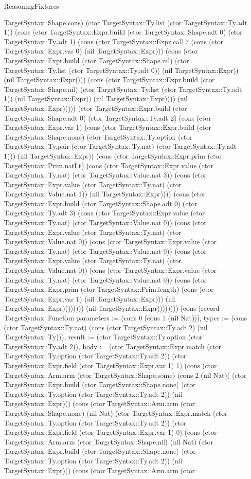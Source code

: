 \begin{lexlean}{ReasoningFixtures}
\begin{semanticmodule}
{TargetSyntax::Shape.cons) (ctor TargetSyntax::Ty.list (ctor TargetSyntax::Ty.adt 1)) (cons (ctor TargetSyntax::Expr.build (ctor TargetSyntax::Shape.adt 0) (ctor TargetSyntax::Ty.adt 1) (cons (ctor TargetSyntax::Expr.call 7 (cons (ctor TargetSyntax::Expr.var 0) (nil TargetSyntax::Expr))) (cons (ctor TargetSyntax::Expr.build (ctor TargetSyntax::Shape.nil) (ctor TargetSyntax::Ty.list (ctor TargetSyntax::Ty.adt 0)) (nil TargetSyntax::Expr)) (nil TargetSyntax::Expr)))) (cons (ctor TargetSyntax::Expr.build (ctor TargetSyntax::Shape.nil) (ctor TargetSyntax::Ty.list (ctor TargetSyntax::Ty.adt 1)) (nil TargetSyntax::Expr)) (nil TargetSyntax::Expr)))) (nil TargetSyntax::Expr))))) (ctor TargetSyntax::Expr.build (ctor TargetSyntax::Shape.adt 0) (ctor TargetSyntax::Ty.adt 2) (cons (ctor TargetSyntax::Expr.var 1) (cons (ctor TargetSyntax::Expr.build (ctor TargetSyntax::Shape.none) (ctor TargetSyntax::Ty.option (ctor TargetSyntax::Ty.pair (ctor TargetSyntax::Ty.nat) (ctor TargetSyntax::Ty.adt 1))) (nil TargetSyntax::Expr)) (cons (ctor TargetSyntax::Expr.prim (ctor TargetSyntax::Prim.natLt) (cons (ctor TargetSyntax::Expr.value (ctor TargetSyntax::Ty.nat) (ctor TargetSyntax::Value.nat 3)) (cons (ctor TargetSyntax::Expr.value (ctor TargetSyntax::Ty.nat) (ctor TargetSyntax::Value.nat 1)) (nil TargetSyntax::Expr)))) (cons (ctor TargetSyntax::Expr.build (ctor TargetSyntax::Shape.adt 0) (ctor TargetSyntax::Ty.adt 3) (cons (ctor TargetSyntax::Expr.value (ctor TargetSyntax::Ty.nat) (ctor TargetSyntax::Value.nat 0)) (cons (ctor TargetSyntax::Expr.value (ctor TargetSyntax::Ty.nat) (ctor TargetSyntax::Value.nat 0)) (cons (ctor TargetSyntax::Expr.value (ctor TargetSyntax::Ty.nat) (ctor TargetSyntax::Value.nat 0)) (cons (ctor TargetSyntax::Expr.value (ctor TargetSyntax::Ty.nat) (ctor TargetSyntax::Value.nat 0)) (cons (ctor TargetSyntax::Expr.value (ctor TargetSyntax::Ty.nat) (ctor TargetSyntax::Value.nat 0)) (cons (ctor TargetSyntax::Expr.prim (ctor TargetSyntax::Prim.length) (cons (ctor TargetSyntax::Expr.var 1) (nil TargetSyntax::Expr))) (nil TargetSyntax::Expr)))))))) (nil TargetSyntax::Expr)))))))}) (cons (record TargetSyntax::Function {parameters := (cons 0 (cons 1 (nil Nat))), types := (cons (ctor TargetSyntax::Ty.nat) (cons (ctor TargetSyntax::Ty.adt 2) (nil TargetSyntax::Ty))), result := (ctor TargetSyntax::Ty.option (ctor TargetSyntax::Ty.adt 2)), body := (ctor TargetSyntax::Expr.match (ctor TargetSyntax::Ty.option (ctor TargetSyntax::Ty.adt 2)) (ctor TargetSyntax::Expr.field (ctor TargetSyntax::Expr.var 1) 1) (cons (ctor TargetSyntax::Arm.arm (ctor TargetSyntax::Shape.some) (cons 2 (nil Nat)) (ctor TargetSyntax::Expr.build (ctor TargetSyntax::Shape.none) (ctor TargetSyntax::Ty.option (ctor TargetSyntax::Ty.adt 2)) (nil TargetSyntax::Expr))) (cons (ctor TargetSyntax::Arm.arm (ctor TargetSyntax::Shape.none) (nil Nat) (ctor TargetSyntax::Expr.match (ctor TargetSyntax::Ty.option (ctor TargetSyntax::Ty.adt 2)) (ctor TargetSyntax::Expr.field (ctor TargetSyntax::Expr.var 1) 0) (cons (ctor TargetSyntax::Arm.arm (ctor TargetSyntax::Shape.nil) (nil Nat) (ctor TargetSyntax::Expr.build (ctor TargetSyntax::Shape.none) (ctor TargetSyntax::Ty.option (ctor TargetSyntax::Ty.adt 2)) (nil TargetSyntax::Expr))) (cons (ctor TargetSyntax::Arm.arm (ctor }
\end{semanticmodule}
\end{lexlean}
